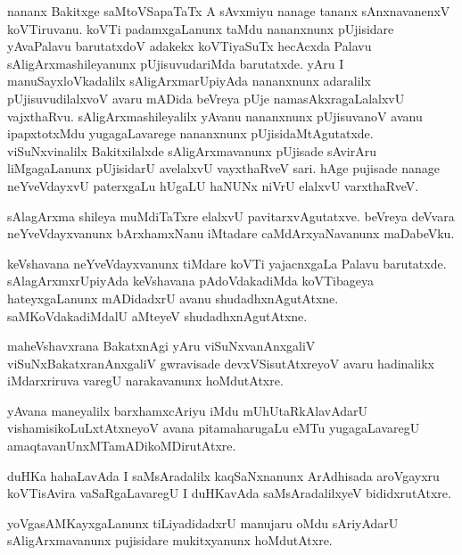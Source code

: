 \documentclass{article}
\begin{document}
\begin{mn}%
nananx Bakitxge saMtoVSapaTaTx A sAvxmiyu nanage tananx sAnxnavanenxV koVTiruvanu. koVTi 
padamxgaLanunx taMdu nananxnunx pUjisidare yAvaPalavu barutatxdoV adakekx koVTiyaSuTx hecAcxda 
Palavu sAligArxmashileyanunx pUjisuvudariMda barutatxde. yAru I manuSayxloVkadalilx 
sAligArxmarUpiyAda nananxnunx adaralilx pUjisuvudilalxvoV avaru mADida beVreya pUje 
namasAkxragaLalalxvU vajxthaRvu. sAligArxmashileyalilx yAvanu nananxnunx pUjisuvanoV avanu 
ipapxtotxMdu yugagaLavarege nananxnunx pUjisidaMtAgutatxde. viSuNxvinalilx Bakitxilalxde 
sAligArxmavanunx pUjisade sAvirAru liMgagaLanunx pUjisidarU avelalxvU vayxthaRveV sari. hAge 
pujisade nanage neYveVdayxvU paterxgaLu hUgaLU haNUNx niVrU elalxvU varxthaRveV.
\end{mn}

\begin{mn}%
sAlagArxma shileya muMdiTaTxre elalxvU pavitarxvAgutatxve. beVreya deVvara neYveVdayxvanunx 
bArxhamxNanu iMtadare caMdArxyaNavanunx maDabeVku.
\end{mn}

\begin{mn}%
keVshavana neYveVdayxvanunx tiMdare koVTi yajacnxgaLa Palavu barutatxde. sAlagArxmxrUpiyAda 
keVshavana pAdoVdakadiMda koVTibageya hateyxgaLanunx mADidadxrU avanu shudadhxnAgutAtxne. 
saMKoVdakadiMdalU aMteyeV shudadhxnAgutAtxne.
\end{mn}

\begin{mn}%
maheVshavxrana BakatxnAgi yAru viSuNxvanAnxgaliV viSuNxBakatxranAnxgaliV gwravisade 
devxVSisutAtxreyoV avaru hadinalikx iMdarxriruva varegU narakavanunx hoMdutAtxre.
\end{mn}

\begin{mn}%
yAvana maneyalilx barxhamxcAriyu iMdu mUhUtaRkAlavAdarU vishamisikoLuLxtAtxneyoV avana 
pitamaharugaLu eMTu yugagaLavaregU amaqtavanUnxMTamADikoMDirutAtxre.
\end{mn}

\begin{mn}%
duHKa hahaLavAda I saMsAradalilx kaqSaNxnanunx ArAdhisada aroVgayxru koVTisAvira vaSaRgaLavaregU I 
duHKavAda saMsAradalilxyeV bididxrutAtxre.
\end{mn}

\begin{mn}%
yoVgasAMKayxgaLanunx tiLiyadidadxrU manujaru oMdu sAriyAdarU sAligArxmavanunx pujisidare 
mukitxyanunx hoMdutAtxre.
\end{mn}
\end{document}
